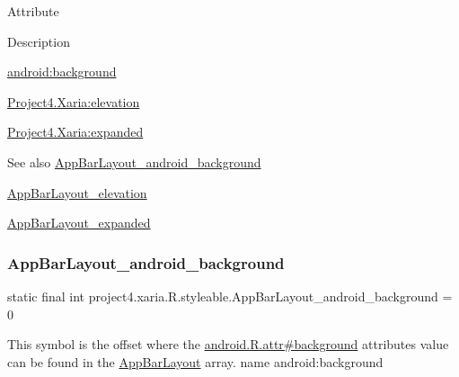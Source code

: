 Attribute

Description 

{\ttfamily \hyperlink{classproject4_1_1xaria_1_1R_1_1styleable_a46bcaa19aa31b02b61e87b390eed677b}{android\+:background}}

{\ttfamily \hyperlink{classproject4_1_1xaria_1_1R_1_1styleable_a19c49765416cea1887a9bc0fbc8d8092}{Project4.\+Xaria\+:elevation}}

{\ttfamily \hyperlink{classproject4_1_1xaria_1_1R_1_1styleable_a1b7cc06243b8bc9ce47a84699605d28b}{Project4.\+Xaria\+:expanded}}

\begin{DoxySeeAlso}{See also}
\hyperlink{classproject4_1_1xaria_1_1R_1_1styleable_a46bcaa19aa31b02b61e87b390eed677b}{App\+Bar\+Layout\+\_\+android\+\_\+background} 

\hyperlink{classproject4_1_1xaria_1_1R_1_1styleable_a19c49765416cea1887a9bc0fbc8d8092}{App\+Bar\+Layout\+\_\+elevation} 

\hyperlink{classproject4_1_1xaria_1_1R_1_1styleable_a1b7cc06243b8bc9ce47a84699605d28b}{App\+Bar\+Layout\+\_\+expanded} 
\end{DoxySeeAlso}
\mbox{\label{classproject4_1_1xaria_1_1R_1_1styleable_a46bcaa19aa31b02b61e87b390eed677b}} 
\subsubsection{\texorpdfstring{App\+Bar\+Layout\+\_\+android\+\_\+background}{AppBarLayout\_android\_background}}
{\footnotesize\ttfamily static final int project4.\+xaria.\+R.\+styleable.\+App\+Bar\+Layout\+\_\+android\+\_\+background = 0\hspace{0.3cm}{\ttfamily [static]}}

This symbol is the offset where the \hyperlink{}{android.\+R.\+attr\#background} attribute\textquotesingle{}s value can be found in the \hyperlink{classproject4_1_1xaria_1_1R_1_1styleable_aff523d344137cf82b06e00b519e99093}{App\+Bar\+Layout} array.  name android\+:background \mbox{\label{classproject4_1_1xaria_1_1R_1_1styleable_a19c49765416cea1887a9bc0fbc8d8092}} 
